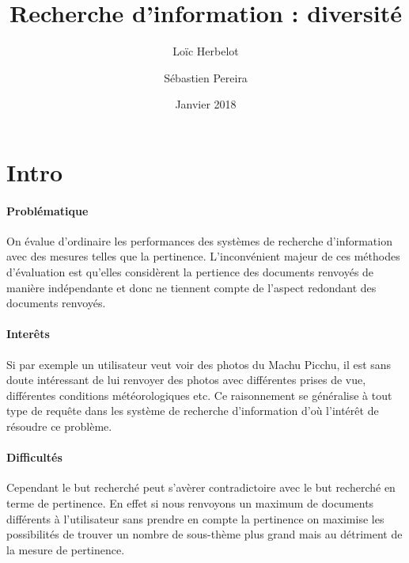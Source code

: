 \documentclass{article}
\title{Recherche d'information : diversité}
\date{Janvier 2018}
\author{
   Loïc Herbelot
   \and
   Sébastien Pereira
  }
\begin{document}
\maketitle 


\tableofcontents{}




\section{Intro}

\paragraph{Problématique}

On évalue d'ordinaire les performances des systèmes de recherche d'information avec des mesures telles que la pertinence. L'inconvénient majeur de ces méthodes d'évaluation est qu'elles considèrent la pertience des documents renvoyés de manière indépendante et donc ne tiennent compte de l'aspect redondant des documents renvoyés.

\paragraph{Interêts}
Si par exemple un utilisateur veut voir des photos du Machu Picchu, il est sans doute intéressant de lui renvoyer des photos avec différentes prises de vue, différentes conditions météorologiques etc. Ce raisonnement se généralise à tout type de requête dans les système de recherche d'information d'où l'intérêt de résoudre ce problème.
\paragraph{Difficultés}
Cependant le but recherché peut s'avèrer contradictoire avec le but recherché en terme de pertinence. En effet si nous renvoyons un maximum de documents différents à l'utilisateur sans prendre en compte la pertinence on maximise les possibilités de trouver un nombre de sous-thème plus grand mais au détriment de la mesure de pertinence.
\end{document}
